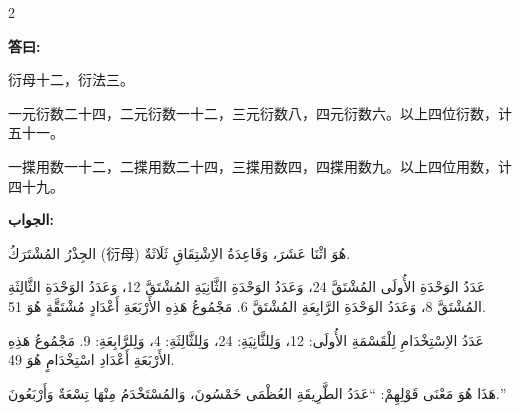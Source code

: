 \documentclass[11pt,a4paper]{article}
\newcommand{\ar}[1]{\arabicfont\beginR #1\endR}
\providecommand{\enquote}[1]{``#1''}
\newenvironment{bilingual}{%
  \begin{paracol}{2}
}{%
  \end{paracol}
}
\newcommand{\cnlabel}[1]{\textcolor{algocolor}{\textbf{#1}}}
\newcommand{\arlabel}[1]{\ar{\textcolor{algocolor}{\textbf{#1}}}}
\begin{document}
\begin{bilingual}

\begin{leftcolumn*}
\cnlabel{答曰:}

衍母十二，衍法三。

一元衍数二十四，二元衍数一十二，三元衍数八，四元衍数六。以上四位衍数，计五十一。

一揲用数一十二，二揲用数二十四，三揲用数四，四揲用数九。以上四位用数，计四十九。
\end{leftcolumn*}

\begin{rightcolumn*}
\arlabel{الجواب:}

\ar{الجِذْرُ المُشْتَرَكُ (衍母) هُوَ اثْنَا عَشَرَ، وَقَاعِدَةُ الاِشْتِقَاقِ ثَلَاثَةٌ.}

\ar{عَدَدُ الوَحْدَةِ الأُولَى المُشْتَقَّ 24، وَعَدَدُ الوَحْدَةِ الثَّانِيَةِ المُشْتَقَّ 12، وَعَدَدُ الوَحْدَةِ الثَّالِثَةِ المُشْتَقَّ 8، وَعَدَدُ الوَحْدَةِ الرَّابِعَةِ المُشْتَقَّ 6. مَجْمُوعُ هَذِهِ الأَرْبَعَةِ أَعْدَادٍ مُشْتَقَّةٍ هُوَ 51.}

\ar{عَدَدُ الاِسْتِخْدَامِ لِلْقَسْمَةِ الأُولَى: 12، وَلِلثَّانِيَةِ: 24، وَلِلثَّالِثَةِ: 4، وَلِلرَّابِعَةِ: 9. مَجْمُوعُ هَذِهِ الأَرْبَعَةِ أَعْدَادِ اسْتِخْدَامٍ هُوَ 49.}

\ar{هَذَا هُوَ مَعْنَى قَوْلِهِمْ: \enquote{عَدَدُ الطَّرِيقَةِ العُظْمَى خَمْسُونَ، وَالمُسْتَخْدَمُ مِنْهَا تِسْعَةٌ وَأَرْبَعُونَ.}}
\end{rightcolumn*}

\end{bilingual}

\vspace{1em}
\end{document}
